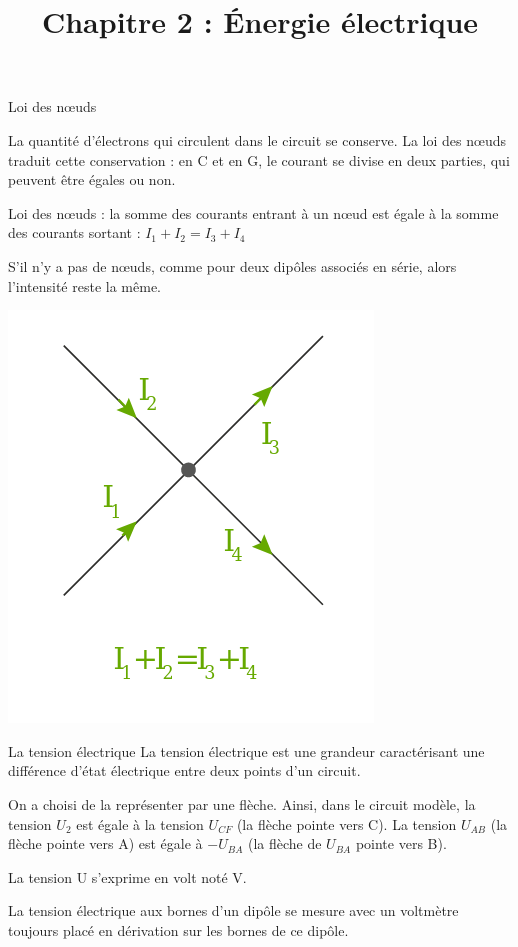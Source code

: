 \documentclass[24pt]{article}
\begin{document}
\cfoot{}
\date{}
\title{\huge Chapitre 2 : Énergie électrique}
\maketitle %

\programme


\vspace{-10pt}

\begin{concept}{Loi des nœuds}
    \begin{minipage}[c]{0.75\textwidth}
        La quantité d’électrons qui circulent dans le circuit se conserve. La loi des nœuds traduit
        cette conservation : en C et en G, le courant se divise en deux parties, qui peuvent être
        égales ou non.

        Loi des nœuds : la somme des courants entrant à un nœud est égale à la somme des courants sortant :
        $I_1+I_2=I_3+I_4$

        S’il n’y a pas de nœuds, comme pour deux dipôles associés en série, alors l’intensité reste la même.
    \end{minipage}
    \begin{minipage}[c]{0.3\textwidth}
        \begin{center}
            \includegraphics[width=0.4\columnwidth]{noeud.png}
        \end{center}
    \end{minipage}
\end{concept}


\begin{concept}{La tension électrique}
    La tension électrique est une grandeur caractérisant une différence d’état électrique entre
    deux points d’un circuit.

    On a choisi de la représenter par une flèche. Ainsi, dans le circuit modèle,
    la tension $U_2$ est égale à la tension $U_{CF}$ (la flèche pointe vers C).
    La tension $U_{AB}$ (la flèche pointe vers A) est égale à $-U_{BA}$
    (la flèche de $U_{BA}$ pointe vers B).

    La tension U s’exprime en volt noté V.

    La tension électrique aux bornes d’un dipôle se mesure avec un voltmètre
    toujours placé en dérivation sur les bornes de ce dipôle.
\end{concept}
\end{document}
